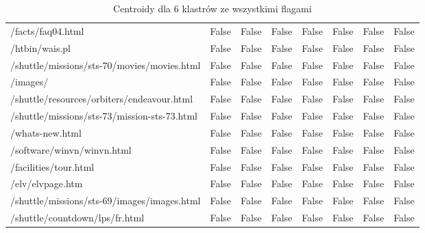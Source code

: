 \documentclass[../EDI_Task1_Karwowski_Kowalewski.tex]{subfiles}
\begin{document}
{{{\begin{table}[!htbp]
\begin{tabular}{|l|c|c|c|c|c|c|c|}
                    /facts/faq04.html                                &      False   &   False   &   False   &   False   &   False   &   False   &   False \\
                    /htbin/wais.pl                                   &      False   &   False   &   False   &   False   &   False   &   False   &   False \\
                    /shuttle/missions/sts-70/movies/movies.html      &      False   &   False   &   False   &   False   &   False   &   False   &   False \\
                    /images/                                         &      False   &   False   &   False   &   False   &   False   &   False   &   False \\
                    /shuttle/resources/orbiters/endeavour.html       &      False   &   False   &   False   &   False   &   False   &   False   &   False \\
                    /shuttle/missions/sts-73/mission-sts-73.html     &      False   &   False   &   False   &   False   &   False   &   False   &   False \\
                    /whats-new.html                                  &      False   &   False   &   False   &   False   &   False   &   False   &   False \\
                    /software/winvn/winvn.html                       &      False   &   False   &   False   &   False   &   False   &   False   &   False \\
                    /facilities/tour.html                            &      False   &   False   &   False   &   False   &   False   &   False   &   False \\
                    /elv/elvpage.htm                                 &      False   &   False   &   False   &   False   &   False   &   False   &   False \\
                    /shuttle/missions/sts-69/images/images.html      &      False   &   False   &   False   &   False   &   False   &   False   &   False \\
                    /shuttle/countdown/lps/fr.html                   &      False   &   False   &   False   &   False   &   False   &   False   &   False \\ \hline
                \end{tabular}
                \caption
                {Centroidy dla 6 klastrów ze wszystkimi flagami}
                \label{sessions_flag_k_6}
            \end{table}

}}}
\end{document}
